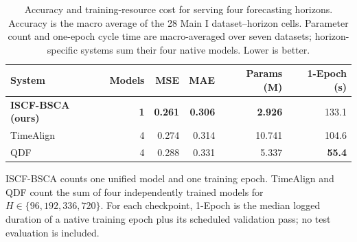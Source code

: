 \documentclass[10pt]{article}
\begin{document}
\begin{table}[t]
\centering
\caption{Accuracy and training-resource cost for serving four forecasting horizons. Accuracy is the macro average of the 28 Main I dataset--horizon cells. Parameter count and one-epoch cycle time are macro-averaged over seven datasets; horizon-specific systems sum their four native models. Lower is better.}
\label{tab:iscf-bsca-efficiency}
\small
\setlength{\tabcolsep}{6pt}
\begin{tabular}{lrrrrr}
\toprule
System & Models & MSE & MAE & Params (M) & 1-Epoch (s) \\
\midrule
\textbf{ISCF-BSCA (ours)} & \textbf{1} & \textbf{0.261} & \textbf{0.306} & \textbf{2.926} & 133.1 \\
TimeAlign & 4 & 0.274 & 0.314 & 10.741 & 104.6 \\
QDF & 4 & 0.288 & 0.331 & 5.337 & \textbf{55.4} \\
\bottomrule
\end{tabular}
\vspace{2pt}
\parbox{0.98\linewidth}{\footnotesize ISCF-BSCA counts one unified model and one training epoch. TimeAlign and QDF count the sum of four independently trained models for $H\in\{96,192,336,720\}$. For each checkpoint, 1-Epoch is the median logged duration of a native training epoch plus its scheduled validation pass; no test evaluation is included.}
\end{table}
\end{document}
